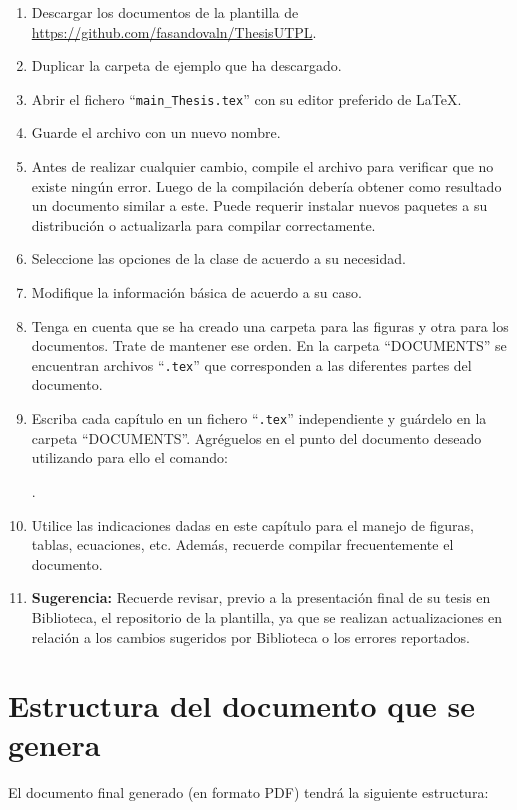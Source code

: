 \begin{enumerate}
	\item Descargar los documentos de la plantilla de \url{https://github.com/fasandovaln/ThesisUTPL}.
	\item Duplicar la carpeta de ejemplo que ha descargado. 
	\item Abrir el fichero ``\lstinline|main_Thesis.tex|'' con su editor preferido de \LaTeX.
	\item Guarde el archivo con un nuevo nombre. 
	\item Antes de realizar cualquier cambio, compile el archivo para verificar que no existe ningún error. Luego de la compilación debería obtener como resultado un documento similar a este. Puede requerir instalar nuevos paquetes a su distribución o actualizarla para compilar correctamente. 
	\item Seleccione las opciones de la clase de acuerdo a su necesidad. 
	\item Modifique la información básica de acuerdo a su caso. 
	\item Tenga en cuenta que se ha creado una carpeta para las figuras y otra para los documentos. Trate de mantener ese orden. En la carpeta ``DOCUMENTS'' se encuentran archivos ``\texttt{.tex}'' que corresponden a las diferentes partes del documento. 
	\item Escriba cada capítulo en un fichero ``\texttt{.tex}'' independiente y guárdelo en la carpeta ``DOCUMENTS''. Agréguelos en el punto del documento deseado utilizando para ello el comando:
	\begin{center}
		\lstinline||.
	\end{center}
	\item Utilice las indicaciones dadas en este capítulo para el manejo de figuras, tablas, ecuaciones, etc. Además, recuerde compilar frecuentemente el documento. 
	\item \textbf{Sugerencia:} Recuerde revisar, previo a la presentación final de su tesis en Biblioteca, el repositorio de la plantilla, ya que se realizan actualizaciones en relación a los cambios sugeridos por Biblioteca o los errores reportados. 
\end{enumerate}

\section{Estructura del documento que se genera}
El documento final generado (en formato PDF) tendrá la siguiente estructura:

